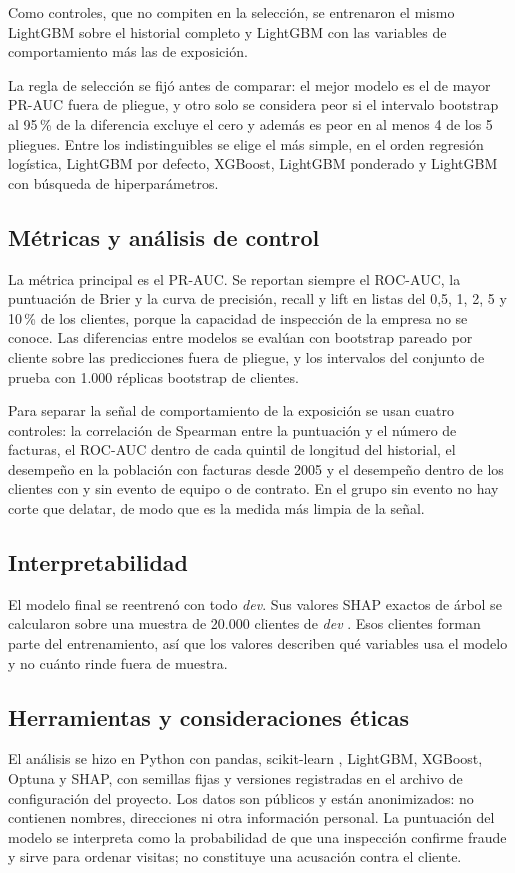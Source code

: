 Como controles, que no compiten en la selección, se entrenaron el mismo LightGBM sobre el
historial completo y LightGBM con las variables de comportamiento más las de exposición.

La regla de selección se fijó antes de comparar: el mejor modelo es el de mayor PR-AUC fuera
de pliegue, y otro solo se considera peor si el intervalo bootstrap al 95\,\% de la
diferencia excluye el cero y además es peor en al menos 4 de los 5 pliegues. Entre los
indistinguibles se elige el más simple, en el orden regresión logística, LightGBM por
defecto, XGBoost, LightGBM ponderado y LightGBM con búsqueda de hiperparámetros.

\subsection{Métricas y análisis de control}

La métrica principal es el PR-AUC. Se reportan siempre el ROC-AUC, la puntuación de Brier y
la curva de precisión, recall y lift en listas del 0,5, 1, 2, 5 y 10\,\% de los clientes,
porque la capacidad de inspección de la empresa no se conoce. Las diferencias entre modelos
se evalúan con bootstrap pareado por cliente sobre las predicciones fuera de pliegue, y los
intervalos del conjunto de prueba con 1.000 réplicas bootstrap de clientes.

Para separar la señal de comportamiento de la exposición se usan cuatro controles: la
correlación de Spearman entre la puntuación y el número de facturas, el ROC-AUC dentro de
cada quintil de longitud del historial, el desempeño en la población con facturas desde
2005 y el desempeño dentro de los clientes con y sin evento de equipo o de contrato. En el
grupo sin evento no hay corte que delatar, de modo que es la medida más limpia de la señal.

\subsection{Interpretabilidad}

El modelo final se reentrenó con todo \textit{dev}. Sus valores SHAP exactos de árbol se
calcularon sobre una muestra de 20.000 clientes de \textit{dev} \parencite{lundberg2020}.
Esos clientes forman parte del entrenamiento, así que los valores describen qué variables
usa el modelo y no cuánto rinde fuera de muestra.

\subsection{Herramientas y consideraciones éticas}

El análisis se hizo en Python con pandas, scikit-learn \parencite{pedregosa2011}, LightGBM,
XGBoost, Optuna y SHAP, con semillas fijas y versiones registradas en el archivo de
configuración del proyecto. Los datos son públicos y están anonimizados: no contienen
nombres, direcciones ni otra información personal. La puntuación del modelo se interpreta
como la probabilidad de que una inspección confirme fraude y sirve para ordenar visitas;
no constituye una acusación contra el cliente.
